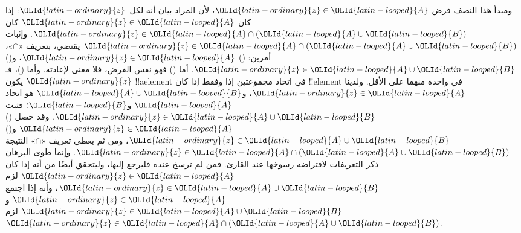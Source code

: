 \documentclass[../../../include/open-logic-section]{subfiles}
\begin{document}
ومبدأ هذا النصف فرض ${\OLId{latin-ordinary}{z}} \in {\OLId{latin-looped}{A}}$، لأن المراد بيان أنه لكل~${\OLId{latin-ordinary}{z}}$: إذا كان
${\OLId{latin-ordinary}{z}} \in {\OLId{latin-looped}{A}}$ كان ${\OLId{latin-ordinary}{z}} \in {\OLId{latin-looped}{A}} \cap ({\OLId{latin-looped}{A}} \cup {\OLId{latin-looped}{B}})$. وإثبات
${\OLId{latin-ordinary}{z}} \in {\OLId{latin-looped}{A}} \cap ({\OLId{latin-looped}{A}} \cup {\OLId{latin-looped}{B}})$ يقتضي، بتعريف «$\cap$»، أمرين: ()
${\OLId{latin-ordinary}{z}} \in {\OLId{latin-looped}{A}}$، و() ${\OLId{latin-ordinary}{z}} \in {\OLId{latin-looped}{A}} \cup {\OLId{latin-looped}{B}}$. أما () فهو نفس الفرض، فلا معنى
لإعادته. وأما ()، فـ${\OLId{latin-ordinary}{z}}$ يكون !!a{element} في اتحاد مجموعتين إذا
وفقط إذا كان !!{element} في واحدة منهما على الأقل. ولدينا
${\OLId{latin-ordinary}{z}} \in {\OLId{latin-looped}{A}}$، و${\OLId{latin-looped}{A}} \cup {\OLId{latin-looped}{B}}$ هو اتحاد ${\OLId{latin-looped}{A}}$ و${\OLId{latin-looped}{B}}$؛ فثبت
${\OLId{latin-ordinary}{z}} \in {\OLId{latin-looped}{A}} \cup {\OLId{latin-looped}{B}}$. وقد حصل () ${\OLId{latin-ordinary}{z}} \in {\OLId{latin-looped}{A}}$ و()
${\OLId{latin-ordinary}{z}} \in {\OLId{latin-looped}{A}} \cup {\OLId{latin-looped}{B}}$، ومن ثم يعطي تعريف «$\cap$» النتيجة
${\OLId{latin-ordinary}{z}} \in {\OLId{latin-looped}{A}} \cap ({\OLId{latin-looped}{A}} \cup {\OLId{latin-looped}{B}})$. وإنما طوى البرهان ذكر التعريفات لافتراضه
رسوخها عند القارئ. فمن لم ترسخ عنده فليرجع إليها، وليتحقق أيضًا من
أنه إذا كان ${\OLId{latin-ordinary}{z}} \in {\OLId{latin-looped}{A}}$ لزم ${\OLId{latin-ordinary}{z}} \in {\OLId{latin-looped}{A}} \cup {\OLId{latin-looped}{B}}$، وأنه إذا اجتمع
${\OLId{latin-ordinary}{z}} \in {\OLId{latin-looped}{A}}$ و${\OLId{latin-ordinary}{z}} \in {\OLId{latin-looped}{A}} \cup {\OLId{latin-looped}{B}}$ لزم ${\OLId{latin-ordinary}{z}} \in {\OLId{latin-looped}{A}} \cap ({\OLId{latin-looped}{A}} \cup {\OLId{latin-looped}{B}})$.
\end{document}
